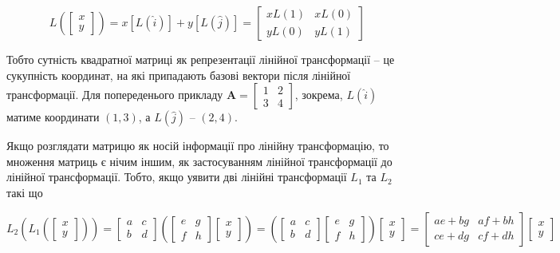 \documentclass[
  11pt,
]{book}
\begin{document}
\[L \left( \begin{bmatrix} x \\ y \end{bmatrix} \right) = x[L (\hat{i})] + y[L(\hat{j})] = \begin{bmatrix} x L(1) & xL(0) \\ y L(0) & y L(1) \end{bmatrix}\]

Тобто сутність квадратної матриці як репрезентації лінійної
трансформації -- це сукупність координат, на які припадають базові
вектори після лінійної трансформації. Для попереденього прикладу
\(\mathbf{A} = \begin{bmatrix} 1 & 2 \\ 3 & 4 \end{bmatrix}\), зокрема,
\(L(\hat{i})\) матиме координати \((1, 3)\), а \(L(\hat{j})\) --
\((2, 4)\).

Якщо розглядати матрицю як носій інформації про лінійну трансформацію,
то множення матриць є нічим іншим, як застосуванням лінійної
трансформації до лінійної трансформації. Тобто, якщо уявити дві лінійні
трансформації \(L_1\) та \(L_2\) такі що

\[L_2 \left( L_1 \left( \begin{bmatrix} 
x \\ 
y 
\end{bmatrix} \right) \right) = 
\begin{bmatrix} 
a & c \\ 
b & d
\end{bmatrix}
\left( 
\begin{bmatrix} 
e & g \\ 
f & h
\end{bmatrix}
\begin{bmatrix} 
x \\ 
y 
\end{bmatrix}
\right) = 
\left( 
\begin{bmatrix} 
a & c \\ 
b & d
\end{bmatrix}
\begin{bmatrix} 
e & g \\ 
f & h
\end{bmatrix}
\right)
\begin{bmatrix} 
x \\ 
y 
\end{bmatrix} = 
\begin{bmatrix} 
ae + bg & af + bh \\ 
ce + dg & cf + dh
\end{bmatrix}
\begin{bmatrix} 
x \\ 
y 
\end{bmatrix}\]
\end{document}
